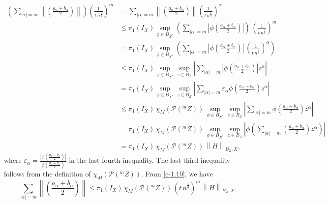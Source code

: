 \documentclass[a4paper,11pt, reqno]{amsart}
\theoremstyle{definition}
\newcommand{\norm}[1]{\left\lVert#1\right\rVert}
\begin{document}
	\begin{align} \label{e-1.19}
		\left(\sum_{|\alpha|=m} \norm{\left(\frac{a_{\alpha} + b_{\alpha}}{2}\right)}\right) \left(\frac{1}{t \, n^{\frac{1}{q}}}\right)^m \nonumber
		& = \sum_{|\alpha|=m} \norm{\left(\frac{a_{\alpha} + b_{\alpha}}{2}\right)} \left(\frac{1}{t \, n^{\frac{1}{q}}}\right)^{\alpha} \\ \nonumber
		&\leq \pi_{1}(I_{X}) \sup_{\phi \in B_{X^{*}}} \left(\sum_{|\alpha|=m}\left|\phi\left(\frac{a_{\alpha} + b_{\alpha}}{2}\right) \right|\right)\, \left(\frac{1}{t \, n^{\frac{1}{q}}}\right)^m \\ \nonumber
		& = \pi_{1}(I_{X}) \sup_{\phi \in B_{X^{*}}} \left(\sum_{|\alpha|=m}\left|\phi\left(\frac{a_{\alpha} + b_{\alpha}}{2}\right) \right|\, \left(\frac{1}{t \, n^{\frac{1}{q}}}\right)^{\alpha} \right) \\ \nonumber
		& \leq \pi_{1}(I_{X}) \sup_{\phi \in B_{X^{*}}} \sup_{z \in B_{Z}} \left|\sum_{|\alpha|=m}\left|\phi\left(\frac{a_{\alpha} + b_{\alpha}}{2}\right) \right|z^{\alpha}\right| \\ \nonumber
		& = \pi_{1}(I_{X}) \sup_{\phi \in B_{X^{*}}} \sup_{z \in B_{Z}} \left|\sum_{|\alpha|=m} \varepsilon_{\alpha}\phi\left(\frac{a_{\alpha} + b_{\alpha}}{2}\right) z^{\alpha}\right| \\ \nonumber
		& \leq \pi_{1}(I_{X})\, \chi_{M}(\mathcal{P}(^m Z)) \, \sup_{\phi \in B_{X^{*}}} \sup_{z \in B_{Z}} \left|\sum_{|\alpha|=m}\phi\left(\frac{a_{\alpha} + b_{\alpha}}{2}\right) z^{\alpha}\right| \\ \nonumber
		& = \pi_{1}(I_{X})\, \chi_{M}(\mathcal{P}(^m Z)) \, \sup_{\phi \in B_{X^{*}}} \sup_{z \in B_{Z}} \left|\phi \left(\sum_{|\alpha|=m}\left(\frac{a_{\alpha} + b_{\alpha}}{2}\right) z^{\alpha}\right)\right| \\ 
		& = \pi_{1}(I_{X})\, \chi_{M}(\mathcal{P}(^mZ)) \,   \norm{H}_{B_{Z},X}, 
	\end{align}
	where $\varepsilon_{\alpha}=\frac{\left|\phi\left(\frac{a_{\alpha} + b_{\alpha}}{2}\right)\right|}{\phi\left(\frac{a_{\alpha} + b_{\alpha}}{2}\right)}$ in the last fourth inequality. The last third inequality follows from the definition of $\chi_{M}(\mathcal{P}(^m Z))$. From \eqref{e-1.19}, we have
	\begin{equation} \label{snd-e-4.8}
		\sum_{|\alpha|=m} \norm{\left(\frac{a_{\alpha} + b_{\alpha}}{2}\right)} \leq \pi_{1}(I_{X})\, \chi_{M}(\mathcal{P}(^mZ)) \, \left(t\, n^{\frac{1}{q}}\right)^m\, \norm{H}_{B_{Z},X}.
	\end{equation}
	
\end{document}
